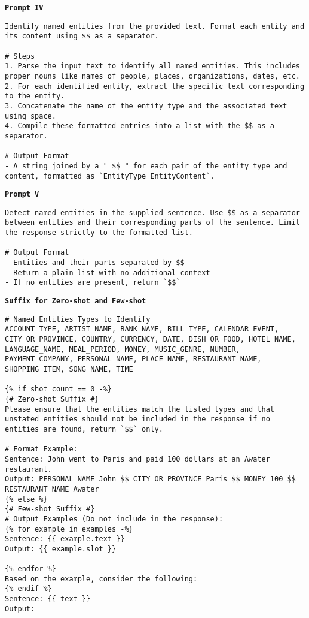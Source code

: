 \texttt{\textbf{Prompt IV}}
\begin{verbatim}
Identify named entities from the provided text. Format each entity and its content using $$ as a separator. 

# Steps
1. Parse the input text to identify all named entities. This includes proper nouns like names of people, places, organizations, dates, etc.
2. For each identified entity, extract the specific text corresponding to the entity.
3. Concatenate the name of the entity type and the associated text using space. 
4. Compile these formatted entries into a list with the $$ as a separator.

# Output Format
- A string joined by a " $$ " for each pair of the entity type and content, formatted as `EntityType EntityContent`.
\end{verbatim}
\texttt{\textbf{Prompt V}}
\begin{verbatim}
Detect named entities in the supplied sentence. Use $$ as a separator between entities and their corresponding parts of the sentence. Limit the response strictly to the formatted list.

# Output Format
- Entities and their parts separated by $$
- Return a plain list with no additional context
- If no entities are present, return `$$`
\end{verbatim}
\texttt{\textbf{Suffix for Zero-shot and Few-shot}}
\begin{verbatim}
# Named Entities Types to Identify
ACCOUNT_TYPE, ARTIST_NAME, BANK_NAME, BILL_TYPE, CALENDAR_EVENT, CITY_OR_PROVINCE, COUNTRY, CURRENCY, DATE, DISH_OR_FOOD, HOTEL_NAME, LANGUAGE_NAME, MEAL_PERIOD, MONEY, MUSIC_GENRE, NUMBER, PAYMENT_COMPANY, PERSONAL_NAME, PLACE_NAME, RESTAURANT_NAME, SHOPPING_ITEM, SONG_NAME, TIME

{% if shot_count == 0 -%}
{# Zero-shot Suffix #}
Please ensure that the entities match the listed types and that unstated entities should not be included in the response if no entities are found, return `$$` only.

# Format Example:
Sentence: John went to Paris and paid 100 dollars at an Awater restaurant.
Output: PERSONAL_NAME John $$ CITY_OR_PROVINCE Paris $$ MONEY 100 $$ RESTAURANT_NAME Awater
{% else %}
{# Few-shot Suffix #}
# Output Examples (Do not include in the response):
{% for example in examples -%}
Sentence: {{ example.text }}
Output: {{ example.slot }}

{% endfor %}
Based on the example, consider the following:
{% endif %}
Sentence: {{ text }}
Output: 
\end{verbatim}

